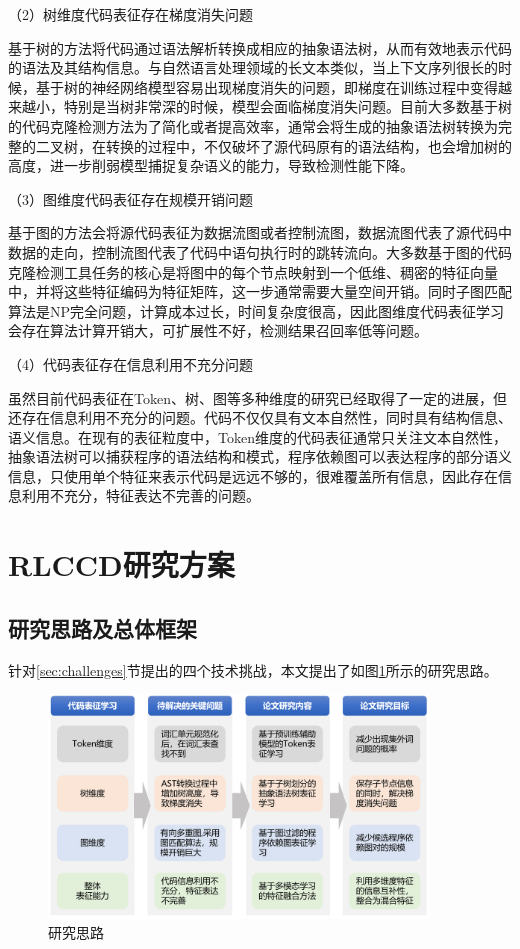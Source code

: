 （2）树维度代码表征存在梯度消失问题

基于树的方法将代码通过语法解析转换成相应的抽象语法树，从而有效地表示代码的语法及其结构信息。与自然语言处理领域的长文本类似，当上下文序列很长的时候，基于树的神经网络模型容易出现梯度消失的问题，即梯度在训练过程中变得越来越小，特别是当树非常深的时候，模型会面临梯度消失问题。目前大多数基于树的代码克隆检测方法为了简化或者提高效率，通常会将生成的抽象语法树转换为完整的二叉树，在转换的过程中，不仅破坏了源代码原有的语法结构，也会增加树的高度，进一步削弱模型捕捉复杂语义的能力，导致检测性能下降。

（3）图维度代码表征存在规模开销问题

基于图的方法会将源代码表征为数据流图或者控制流图，数据流图代表了源代码中数据的走向，控制流图代表了代码中语句执行时的跳转流向。大多数基于图的代码克隆检测工具任务的核心是将图中的每个节点映射到一个低维、稠密的特征向量中，并将这些特征编码为特征矩阵，这一步通常需要大量空间开销。同时子图匹配算法是NP完全问题，计算成本过长，时间复杂度很高，因此图维度代码表征学习会存在算法计算开销大，可扩展性不好，检测结果召回率低等问题。

（4）代码表征存在信息利用不充分问题

虽然目前代码表征在Token、树、图等多种维度的研究已经取得了一定的进展，但还存在信息利用不充分的问题。代码不仅仅具有文本自然性，同时具有结构信息、语义信息。在现有的表征粒度中，Token维度的代码表征通常只关注文本自然性，抽象语法树可以捕获程序的语法结构和模式，程序依赖图可以表达程序的部分语义信息，只使用单个特征来表示代码是远远不够的，很难覆盖所有信息，因此存在信息利用不充分，特征表达不完善的问题。

\section{RLCCD研究方案}
\label{sec:Framework}

\subsection{研究思路及总体框架}
\label{subsec:Ideas}
针对\ref{sec:challenges}节提出的四个技术挑战，本文提出了如图\ref{fig:thinking}所示的研究思路。

\begin{figure}[H]
    \centering
    \includegraphics[width=0.9\textwidth]{figures/thinking}
    \caption{研究思路}\label{fig:thinking}
\end{figure}

